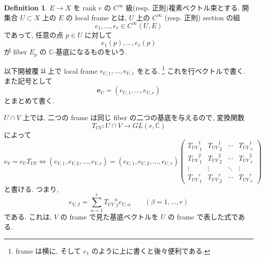 \documentclass[dvipdfmx,a4paper,11pt]{article} %
\theoremstyle{definition}
\newtheorem{defn}[thm]{Definition}
\theoremstyle{remark}
\numberwithin{equation}{section}
\begin{document}
\begin{defn}
\(E\to X\) を rank \(r\) の \(C^{\infty}\) 級(resp. 正則)複素ベクトル束とする. 開集合 \(U\subset X\) 上の \(E\) の local frame とは, \(U\) 上の \(C^{\infty}\) (resp. 正則) section の組
\[
e_1,\ldots,e_r\in C^\infty(U,E)
\]
であって, 任意の点 \(p\in U\) に対して
\[
e_1(p),\ldots,e_r(p)
\]
が fiber \(E_p\) の \(\mathbb{C}\)-基底になるものをいう. 

以下開被覆 \(\mathfrak{U}\) 上で local frame
\(
e_{U,1},\ldots,e_{U,r}
\)
をとる. \footnote{frame は横に, そして \(e_{1}\) のように上に書くと後々便利である.}
これを行ベクトルで書く. また記号として
\[
\mathbf{e}_U=(e_{U,1},\ldots,e_{U,r})
\]
とまとめて書く. 
\end{defn}
\(U\cap V\) 上では, 二つの frame は同じ fiber の二つの基底を与えるので, 
変換関数
\[
T_{UV}\colon U\cap V\longrightarrow GL(r,\mathbb{C})
\]
によって
\begin{equation}
\label{eq-glue-condition}
e_V=e_U T_{UV}
\Leftrightarrow 
(e_{V,1},e_{V,2},\ldots,e_{V,r})
=
(e_{U,1}, e_{U,2},\ldots,e_{U,r})
\begin{pmatrix}
{T_{UV}}^{1}_{\ 1} & {T_{UV}}^{1}_{\ 2}& \cdots & {T_{UV}}^{1}_{\ r}\\
{T_{UV}}^{2}_{\ 1} & {T_{UV}}^{2}_{\ 2}& \cdots & {T_{UV}}^{2}_{\ r}\\
\vdots & \vdots & \ddots & \vdots\\
{T_{UV}}^{r}_{\ 1}& {T_{UV}}^{r}_{\ 2}& \cdots & {T_{UV}}^{r}_{\ r}
\end{pmatrix}
\end{equation}
と書ける. つまり,
\[
e_{V,\beta}
=
\sum_{\alpha=1}^r {T_{UV}}^{\alpha}_{\ \beta}e_{U,\alpha}
\qquad
(\beta=1,\ldots,r)
\]
である. これは, \(V\) の frame で見た基底ベクトルを \(U\) の frame で表した式である.
\end{document}
